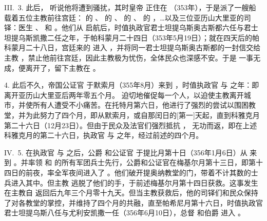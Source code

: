III.~3. 此后， 听说他将遭到骚扰，其时皇帝  正住在 （353年），于是派了一艘船载着五位主教前往宫廷： 的 、 的 、 的 、 的 ，…以及三位亚历山大里亚的司铎：医生 、 和 。他们从  启航后，时值执政官君士坦提乌斯奥古斯都六任与君士坦提乌斯凯撒二任之年，于帕科蒙月二十四日（353年5月19日）；就在四天后的帕科蒙月二十八日，宫廷来的  进入 ，并将同一君士坦提乌斯奥古斯都的一封信交给主教 ，禁止他前往宫廷，因此主教极为忧伤，全体民众也深感不安。于是  一事无成，便离开了，留下主教在 。\par

4. 此后不久，帝国公证官  于默索月（355年8月）来到 ，时值执政官  与  之年：即  离开亚历山大里亚后两年零五个月。 迫切地催促每一个人，以迫使主教离开城市，并使所有人遭受不小痛苦。在托特月第六日，他进行了强烈的尝试以围困教堂，并为此努力了四个月，即从默索月，或自那闰日的[第一]天起，直到科雅克月第二十六日（12月23日）。但由于民众及法官们强烈抵抗 ， 无功而返，即在上述科雅克月的第二十六日，执政官  与  之年，经过前述的四个月。\par

IV.~5. 在执政官  与  之后，公爵  和公证官  于提比月第十日（356年1月6日）从  来到 。并率领  和  的所有军团兵士先行，公爵和公证官在梅基尔月第十三日，即第十四日的前夜，率全军夜间进入了 。他们破开提奥纳教堂的门，带着不计其数的士兵进入其中。但主教  逃脱了他们的手，于前述梅基尔月第十四日获救。这事发生在主教自  返回后九年三个月零十九天。但当主教获救后，他的司铎们和民众保持了对各教堂的掌控，并维持了四个月的共融，直至帕希尼月第十六日，时值执政官君士坦提乌斯八任与尤利安凯撒一任（356年6月10日），总督  和伯爵  进入 。\par

